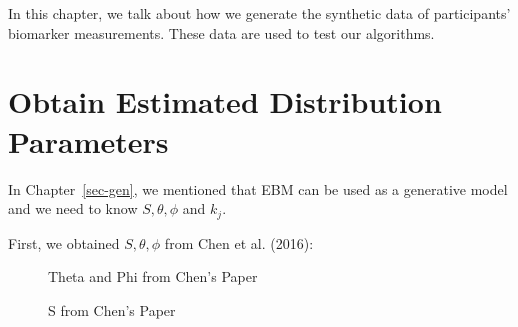 \documentclass[
  letterpaper,
  DIV=11,
  numbers=noendperiod]{scrreprt}
\begin{document}
In this chapter, we talk about how we generate the synthetic data of
participants' biomarker measurements. These data are used to test our
algorithms.

\section{Obtain Estimated Distribution
Parameters}\label{obtain-estimated-distribution-parameters}

In Chapter~\ref{sec-gen}, we mentioned that EBM can be used as a
generative model and we need to know \(S, \theta, \phi\) and \(k_j\).

First, we obtained \(S, \theta, \phi\) from Chen et al. (2016):

\begin{figure}


\caption{\label{fig-chen1}Theta and Phi from Chen's Paper}

\end{figure}%

\begin{figure}


\caption{\label{fig-chen2}S from Chen's Paper}

\end{figure}%
\end{document}

